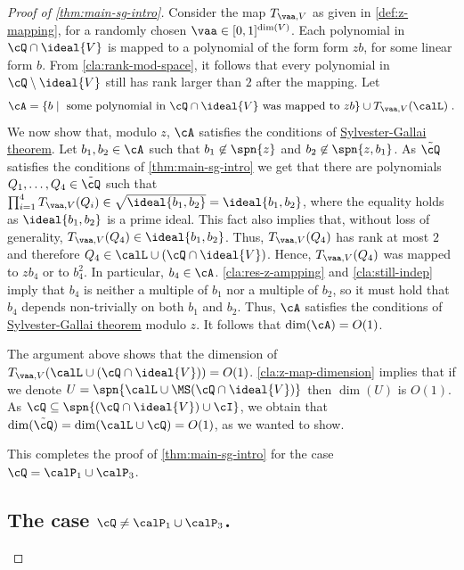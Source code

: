 \begin{proof}[Proof of \autoref{thm:main-sg-intro}]
Consider the map $T_{\vaa,V}$ as given in \autoref{def:z-mapping}, for a randomly chosen $\vaa\in[0,1]^{\dim(V)}$. Each polynomial in $\cQ\cap \ideal{V} $ is mapped to a polynomial of the form form $zb$, for some linear form $b$. From \autoref{cla:rank-mod-space}, it follows that every polynomial in $\cQ\setminus \ideal{V}$ still has rank larger than $2$ after the mapping.
Let $$\cA= \{b \mid \text{ some polynomial in } \cQ\cap \ideal{V}  \text{ was mapped to } zb\} \cup T_{\vaa,V}(\calL) \;.$$
We now show that, modulo $z$, $\cA$ satisfies the conditions of \hyperref[thm:SG-linforms]{Sylvester-Gallai theorem}.
Let $b_1,b_2\in\cA$ such that $b_1 \not\in\spn{z}$ and $b_2 \not\in\spn{z,b_1}$.
As $\tilde\cQ$ satisfies the conditions of \autoref{thm:main-sg-intro} we get that there are  polynomials $Q_1,\ldots,Q_4 \in \tilde\cQ$  such that $\prod_{i=1}^{4}T_{\vaa,V}(Q_i) \in \sqrt{\ideal{b_1,b_2}}=\ideal{b_1,b_2}$, where the equality holds as  $\ideal{b_1,b_2}$ is a prime ideal. This fact also implies that, without loss of generality,  $T_{\vaa,V}(Q_4)\in \ideal{b_1,b_2}$. Thus, $T_{\vaa,V}(Q_4)$ has rank at most $2$ and therefore $Q_4\in\calL\cup(\cQ\cap \ideal{V}) $. Hence, $T_{\vaa,V}(Q_4)$ was mapped to $zb_4$ or to $b_4^2$. In particular, $b_4\in\cA$. \autoref{cla:res-z-ampping} and \autoref{cla:still-indep} imply that $b_4$ is neither a multiple of $b_1$ nor a multiple of $b_2$, so it must hold that $b_4$ depends non-trivially on both $b_1$ and $b_2$. Thus, $\cA$ satisfies the conditions of \hyperref[thm:SG-linforms]{Sylvester-Gallai theorem} modulo $z$. It follows that $\dim(\cA)=O(1)$.

The argument above shows that the dimension of $T_{\vaa,V}(\calL\cup(\cQ\cap \ideal{V}) ) =O(1)$. \autoref{cla:z-map-dimension} implies that if we denote $U = \spn{\calL \cup \MS(\cQ\cap \ideal{V})}$ then  $\dim(U )$ is $O(1)$. As $\cQ \subseteq \spn{(\cQ\cap \ideal{V}) \cup \cI}$, we obtain that $\dim(\tilde\cQ)=\dim(\calL\cup \cQ) = O(1)$, as we wanted to show. 













This completes the proof of \autoref{thm:main-sg-intro} for the case $\cQ=\calP_1\cup\calP_3$.

\subsection{The case $\cQ\neq\calP_1\cup\calP_3$.}


\end{proof}
